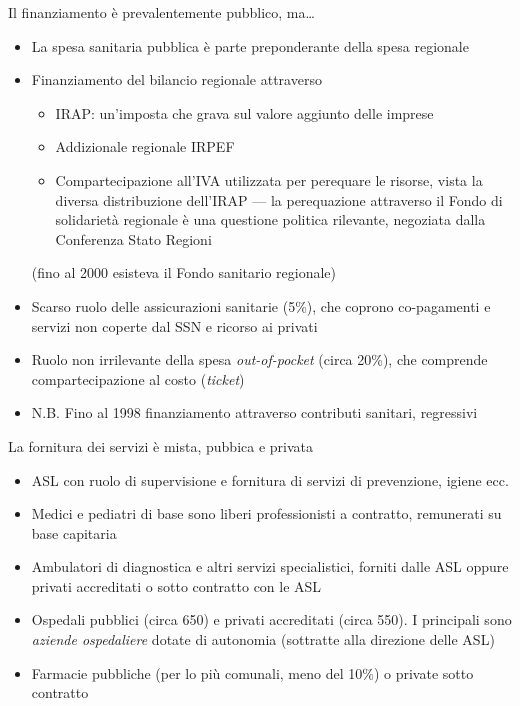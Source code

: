 \documentclass[aspectratio=149,11pt]{beamer}
\begin{document}
\begin{frame}{Il finanziamento è prevalentemente pubblico, ma\ldots{}}
\begin{itemize}
\item La spesa sanitaria pubblica è parte preponderante della spesa regionale
\item Finanziamento del bilancio regionale attraverso 
\begin{itemize}
\item \alert{IRAP}: un'imposta che grava sul valore aggiunto delle imprese
\item \alert{Addizionale regionale IRPEF}
\item \alert{Compartecipazione all'IVA} utilizzata per perequare le risorse, vista la
diversa distribuzione dell'IRAP --- la perequazione attraverso il Fondo di
solidarietà regionale è una questione politica rilevante, negoziata dalla
Conferenza Stato Regioni
\end{itemize}
(fino al 2000 esisteva il Fondo sanitario regionale)
\item Scarso ruolo delle assicurazioni sanitarie (5\%), che coprono co-pagamenti e
servizi non coperte dal SSN e ricorso ai privati
\item Ruolo non irrilevante della spesa \emph{out-of-pocket} (circa 20\%), che
comprende compartecipazione al costo (\emph{ticket})
\item N.B. Fino al 1998 finanziamento attraverso contributi sanitari, regressivi
\end{itemize}
\end{frame}

\begin{frame}{La fornitura dei servizi è mista, pubbica e privata}
\begin{itemize}
\item ASL con ruolo di supervisione e fornitura di servizi di prevenzione, igiene
ecc.
\item Medici e pediatri di base sono liberi professionisti a contratto,
remunerati su base capitaria
\item Ambulatori di diagnostica e altri servizi specialistici, forniti dalle ASL
oppure privati accreditati o sotto contratto con le ASL
\item Ospedali pubblici (circa 650) e privati accreditati (circa 550). I
principali sono \emph{aziende ospedaliere} dotate di autonomia (sottratte alla
direzione delle ASL)
\item Farmacie pubbliche (per lo più comunali, meno del 10\%) o private sotto
contratto
\end{itemize}
\end{frame}
\end{document}
